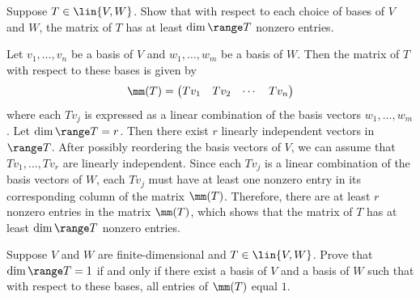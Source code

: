 \begin{exercise}[3c1]
    Suppose $T \in \lin{V, W}$. Show that with respect to each choice of bases of $V$ and $W$, the matrix of $T$ has at least $\dim \range T$ nonzero entries.
\end{exercise}

\begin{sol}
    Let $v_1, \ldots, v_n$ be a basis of $V$ and $w_1, \ldots, w_m$ be a basis of $W$. Then the matrix of $T$ with respect to these bases is given by
    \[\mm(T) = 
    \begin{pmatrix}
        Tv_1 & Tv_2 & \cdots & Tv_n
    \end{pmatrix}
    \]
    where each $Tv_j$ is expressed as a linear combination of the basis vectors $w_1, \ldots, w_m$. Let $\dim \range T = r$. Then there exist $r$ linearly independent vectors in $\range T$. After possibly reordering the basis vectors of $V$, we can assume that $Tv_1, \ldots, Tv_r$ are linearly independent. Since each $Tv_j$ is a linear combination of the basis vectors of $W$, each $Tv_j$ must have at least one nonzero entry in its corresponding column of the matrix $\mm(T)$. Therefore, there are at least $r$ nonzero entries in the matrix $\mm(T)$, which shows that the matrix of $T$ has at least $\dim \range T$ nonzero entries.
\end{sol}

\begin{exercise}[3c2]
    Suppose $V$ and $W$ are finite-dimensional and $T \in \lin{V, W}$. Prove that $\dim \range T = 1$ if and only if there exist a basis of $V$ and a basis of $W$ such that with respect to these bases, all entries of $\mm(T)$ equal $1$.
\end{exercise}


